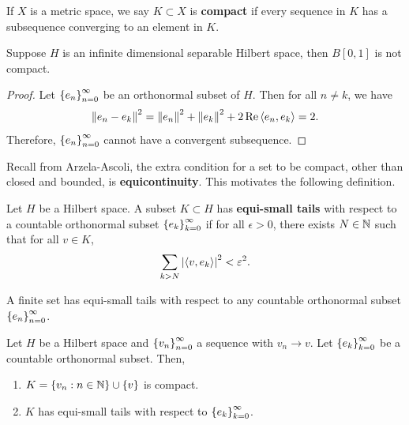 \documentclass[a4paper]{article}
\begin{document}
\begin{defi}[Compact]
If $X$ is a metric space, we say $K \subset X$ 
is \textbf{compact} if every sequence in $K$ 
has a subsequence converging to an element in $K$.
\end{defi}

\begin{eg}
Suppose $H$ is an infinite dimensional separable 
Hilbert space, then $B[0, 1]$ is not compact.
\end{eg}

\begin{proof}
  Let $\left\{ e_n \right\}_{n=0}^\infty$ be an orthonormal subset of $H$. 
  Then for all $n \neq k$, we have 
  \[
  \left\lVert e_n - e_k\right\rVert^2 = \left\lVert e_n\right\rVert^2 + \left\lVert e_k\right\rVert^2 
  + 2 \operatorname{Re} \left\langle e_n, e_k \right\rangle = 2.
  \]
  Therefore, $\left\{ e_n \right\}_{n=0}^\infty$ cannot have a convergent 
  subsequence.
\end{proof}

Recall from Arzela-Ascoli, the extra condition for a 
set to be compact, other than closed and bounded,
is \textbf{equicontinuity}. 
This motivates the following definition. 

\begin{defi}
Let $H$ be a Hilbert space. A subset $K \subset H$ has 
\textbf{equi-small tails} with respect to a countable 
orthonormal subset $\left\{ e_k \right\}_{k=0}^\infty$ if for all 
$\epsilon > 0$, there exists $N \in \mathbb{N}$ such that 
for all $v \in K$, 
\[
\sum_{k > N} \left\lvert \left\langle v, e_k \right\rangle\right\rvert^2 < \varepsilon^2.
\]
\end{defi}

\begin{eg}
A finite set has equi-small tails with respect to 
any countable orthonormal subset $\left\{ e_n \right\}_{n=0}^\infty$.
\end{eg}

\begin{thm}
Let $H$ be a Hilbert space and $\left\{ v_n \right\}_{n=0}^\infty$
a sequence with $v_n \to v$. Let $\left\{ e_k \right\}_{k=0}^\infty$
be a countable orthonormal subset. Then, 
\begin{enumerate}
  \item $K = \left\{ v_n : n \in \mathbb{N} \right\}
  \cup \left\{ v \right\}$ is compact. 
  
  \item $K$ has equi-small tails with respect to 
  $\left\{ e_k \right\}_{k=0}^\infty$.
\end{enumerate}
\end{thm}
\end{document}

